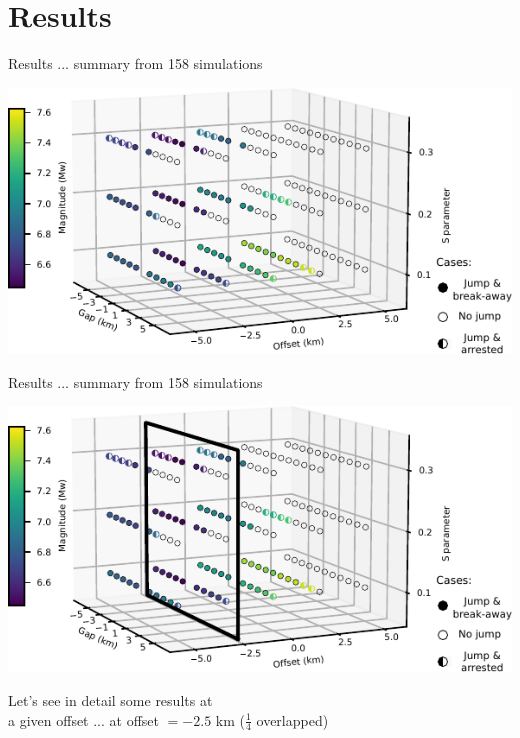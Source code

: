 \documentclass{beamer}
\begin{document}
\section{Results}


\begin{frame}
 {Results ... summary from 158 simulations}
 
 \vskip -0.5cm
  \includegraphics[width=1\linewidth]{images/tests_shmax340}
 
\end{frame}

\begin{frame}
 {Results ... summary from 158 simulations}

  \vskip 0.5cm
  \includegraphics[width=1\linewidth]{images/tests_shmax340_1plane}
  
  \begin{center}
   Let's see in detail some results at \\
   a given offset ... at offset $=-2.5$ km ($\frac{1}{4}$ overlapped) 
  \end{center}

  
   \addtocounter{framenumber}{-1}

\end{frame}
\end{document}
